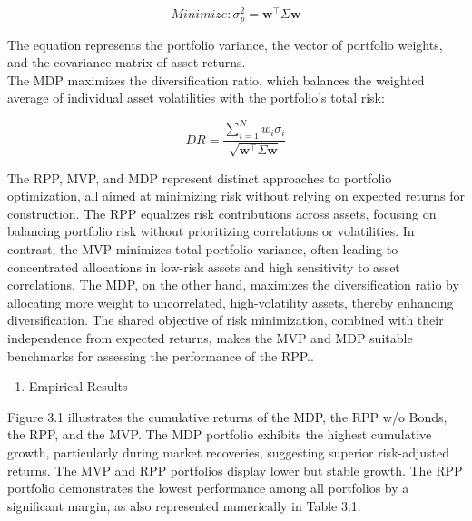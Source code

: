 \documentclass[11pt,preprint]{elsarticle}
\numberwithin{equation}{section}
\numberwithin{figure}{section}
\numberwithin{table}{section}
\def\tightlist{} %
\begin{document}
\begin{equation}
{Minimize:} \sigma_p^2 = \mathbf{w}^\top \Sigma \mathbf{w}
\end{equation}

The equation represents the portfolio variance, the vector of portfolio
weights, and the covariance matrix of asset returns.\\
The MDP maximizes the diversification ratio, which balances the weighted
average of individual asset volatilities with the portfolio's total
risk:

\begin{equation}
{DR} = \frac{\sum_{i=1}^{N} w_i \sigma_i}{\sqrt{\mathbf{w}^\top \Sigma \mathbf{w}}}
\end{equation}

The RPP, MVP, and MDP represent distinct approaches to portfolio
optimization, all aimed at minimizing risk without relying on expected
returns for construction. The RPP equalizes risk contributions across
assets, focusing on balancing portfolio risk without prioritizing
correlations or volatilities. In contrast, the MVP minimizes total
portfolio variance, often leading to concentrated allocations in
low-risk assets and high sensitivity to asset correlations. The MDP, on
the other hand, maximizes the diversification ratio by allocating more
weight to uncorrelated, high-volatility assets, thereby enhancing
diversification. The shared objective of risk minimization, combined
with their independence from expected returns, makes the MVP and MDP
suitable benchmarks for assessing the performance of the RPP..

\begin{enumerate}
\def\labelenumi{\arabic{enumi}.}
\setcounter{enumi}{4}
\tightlist
\item
  Empirical Results
\end{enumerate}

Figure 3.1 illustrates the cumulative returns of the MDP, the RPP w/o
Bonds, the RPP, and the MVP. The MDP portfolio exhibits the highest
cumulative growth, particularly during market recoveries, suggesting
superior risk-adjusted returns. The MVP and RPP portfolios display lower
but stable growth. The RPP portfolio demonstrates the lowest performance
among all portfolios by a significant margin, as also represented
numerically in Table 3.1.
\end{document}
